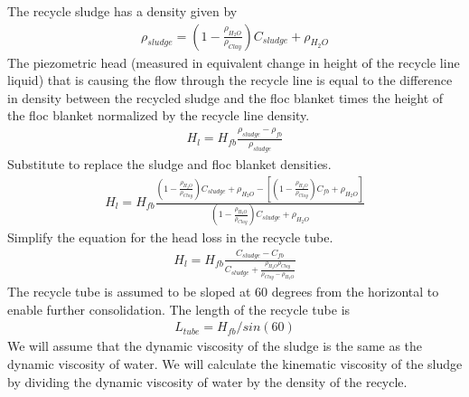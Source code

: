 \documentclass[letterpaper,10pt,english]{sphinxmanual}
\begin{document}
The recycle sludge has a density given by
\begin{equation}\label{equation:Sedimentation/Sed_Theory_and_Future_Work:Sedimentation/Sed_Theory_and_Future_Work:11}
\begin{split}\rho_{sludge} = \left( 1 - \frac{\rho_{H_2O}}{\rho_{Clay}} \right) C_{sludge} + \rho_{H_2O}\end{split}
\end{equation}
The piezometric head (measured in equivalent change in height of the recycle line liquid) that is causing the flow through the recycle line is equal to the difference in density between the recycled sludge and the floc blanket times the height of the floc blanket normalized by the recycle line density.
\begin{equation}\label{equation:Sedimentation/Sed_Theory_and_Future_Work:Sedimentation/Sed_Theory_and_Future_Work:12}
\begin{split}H_l = H_{fb}\frac{\rho_{sludge} - \rho_{fb}}{\rho_{sludge}}\end{split}
\end{equation}
Substitute to replace the sludge and floc blanket densities.
\begin{equation}\label{equation:Sedimentation/Sed_Theory_and_Future_Work:Sedimentation/Sed_Theory_and_Future_Work:13}
\begin{split}H_l = H_{fb}\frac{\left( 1 - \frac{\rho_{H_2O}}{\rho_{Clay}} \right) C_{sludge} + \rho_{H_2O} -\left[  \left( 1 - \frac{\rho_{H_2O}}{\rho_{Clay}} \right) C_{fb} + \rho_{H_2O} \right]} {\left( 1 - \frac{\rho_{H_2O}}{\rho_{Clay}} \right) C_{sludge} + \rho_{H_2O}}\end{split}
\end{equation}
Simplify the equation for the head loss in the recycle tube.
\begin{equation}\label{equation:Sedimentation/Sed_Theory_and_Future_Work:Sedimentation/Sed_Theory_and_Future_Work:14}
\begin{split}H_l = H_{fb}\frac{ C_{sludge} -C_{fb}} { C_{sludge} + \frac{\rho_{H_2O}\rho_{Clay}}{  \rho_{Clay} -\rho_{H_2O} }}\end{split}
\end{equation}
The recycle tube is assumed to be sloped at 60 degrees from the horizontal to enable further consolidation. The length of the recycle tube is
\begin{equation}\label{equation:Sedimentation/Sed_Theory_and_Future_Work:Sedimentation/Sed_Theory_and_Future_Work:15}
\begin{split}L_{tube} = H_{fb}/sin(60)\end{split}
\end{equation}
We will assume that the dynamic viscosity of the sludge is the same as the dynamic viscosity of water. We will calculate the kinematic viscosity of the sludge by dividing the dynamic viscosity of water by the density of the recycle.
\end{document}
